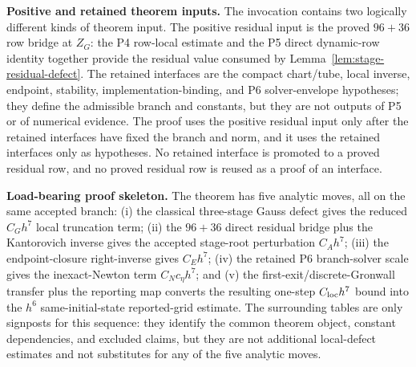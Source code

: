 \documentclass[preprint,12pt]{elsarticle}
\begin{document}
\noindent\textbf{Positive and retained theorem inputs.}
The invocation contains two logically different kinds of theorem input.  The
positive residual input is the proved \(96+36\) row bridge at \(Z_G\): the
P4 row-local estimate and the P5 direct dynamic-row identity together provide
the residual value consumed by Lemma~\ref{lem:stage-residual-defect}.  The
retained interfaces are the compact chart/tube, local inverse, endpoint,
stability, implementation-binding, and P6 solver-envelope hypotheses; they
define the admissible branch and constants, but they are not outputs of P5 or
of numerical evidence.  The proof uses the positive residual input only after
the retained interfaces have fixed the branch and norm, and it uses the
retained interfaces only as hypotheses.  No retained interface is promoted to
a proved residual row, and no proved residual row is reused as a proof of an
interface.

\noindent\textbf{Load-bearing proof skeleton.}
The theorem has five analytic moves, all on the same accepted branch: (i) the
classical three-stage Gauss defect gives the reduced \(C_Gh^7\) local
truncation term; (ii) the \(96+36\) direct residual bridge plus the
Kantorovich inverse gives the accepted stage-root perturbation \(C_Ah^7\);
(iii) the endpoint-closure right-inverse gives \(C_Eh^7\); (iv) the retained
P6 branch-solver scale gives the inexact-Newton term \(C_Nc_\eta h^7\); and
(v) the first-exit/discrete-Gronwall transfer plus the reporting map converts
the resulting one-step \(C_{\rm loc}h^7\) bound into the \(h^6\)
same-initial-state reported-grid estimate.  The surrounding tables are only
signposts for this sequence:
they identify the common theorem object, constant dependencies, and excluded
claims, but they are not additional local-defect estimates and not substitutes
for any of the five analytic moves.
\end{document}
